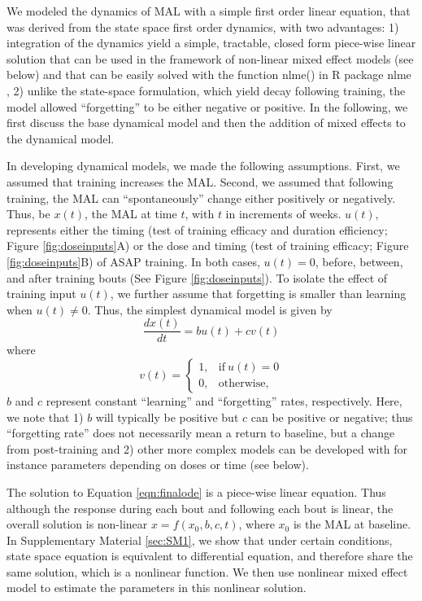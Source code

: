We modeled the dynamics of MAL with a simple first order linear equation, that was derived from the state space first order dynamics, with two advantages: 1) integration of the dynamics yield a simple, tractable, closed form piece-wise linear solution that can be used in the framework of non-linear mixed effect models (see below) and that can be easily solved with the function \textsf{nlme()} in \textsf{R} package \textsf{nlme} \cite{Pinheiro2015}, 2) unlike the state-space formulation, which yield decay following training, the model allowed “forgetting” to be either negative or positive. 
In the following, we first discuss the base dynamical model and then the addition of mixed effects to the dynamical model.

In developing dynamical models, we made the following assumptions. 
First, we assumed that training increases the MAL. 
Second, we assumed that following training, the MAL can “spontaneously” change either positively or negatively. 
Thus, be $ x(t) $, the MAL at time $ t $, with $ t $ in increments of weeks. 
$ u(t) $, represents either the timing (test of training efficacy and duration efficiency; Figure \ref{fig:doseinputs}A) or the dose and timing (test of training efficacy; Figure \ref{fig:doseinputs}B) of ASAP training. 
In both cases, $ u(t) = 0 $, before, between, and after training bouts (See Figure \ref{fig:doseinputs}). 
To isolate the effect of training input $ u(t) $, we further assume that forgetting is smaller than learning when $ u(t) \neq 0 $. 
Thus, the simplest dynamical model is given by
\begin{equation}\label{eqn:finalode}
	\frac{dx(t)}{dt} = bu(t) + cv(t)
\end{equation}
where
\begin{equation}
v(t) = 
\begin{cases}
	1, & \text{if}\ u(t) = 0 \\
	0, & \text{otherwise},
\end{cases}
\end{equation}
$ b $ and $ c $ represent constant “learning” and “forgetting” rates, respectively. 
Here, we note that 1) $ b $ will typically be positive but $ c $ can be positive or negative; thus “forgetting rate” does not necessarily mean a return to baseline, but a change from post-training and 2) other more complex models can be developed with for instance parameters depending on doses or time (see below). 

The solution to Equation \ref{eqn:finalode} is a piece-wise linear equation. 
Thus although the response during each bout and following each bout is linear, the overall solution is non-linear
$ x = f(x_0,b,c,t) $, where $ x_0 $ is the MAL at baseline. 
In Supplementary Material \ref{sec:SM1}, we show that under certain conditions, state space equation is equivalent to differential equation, and therefore share the same solution, which is a nonlinear function. 
We then use nonlinear mixed effect model to estimate the parameters in this nonlinear solution.

